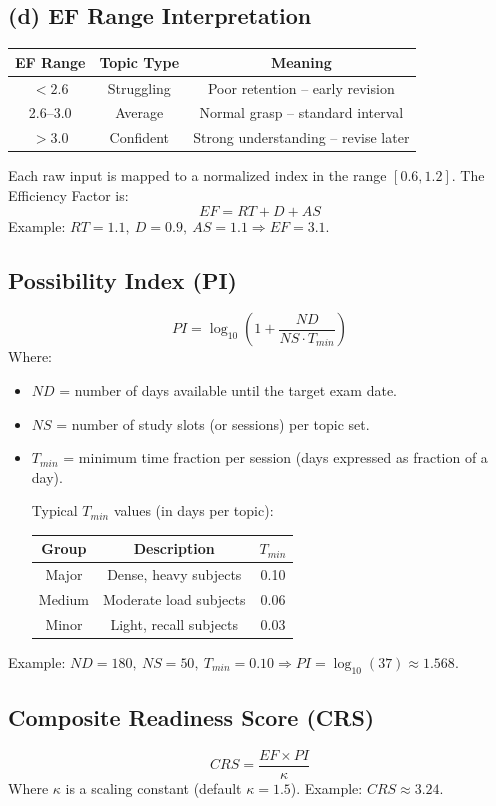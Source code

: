 \documentclass[11pt]{article}
\begin{document}
\subsection*{(d) EF Range Interpretation}
\begin{tabular}{ccc}
\toprule
EF Range & Topic Type & Meaning \\
\midrule
\(< 2.6\) & Struggling & Poor retention -- early revision \\
2.6--3.0 & Average & Normal grasp -- standard interval \\
\(> 3.0\) & Confident & Strong understanding -- revise later \\
\bottomrule
\end{tabular}
Each raw input is mapped to a normalized index in the range $[0.6,1.2]$. The Efficiency Factor is:
\[
EF = RT + D + AS
\]
Example: $RT=1.1,\ D=0.9,\ AS=1.1 \Rightarrow EF=3.1$.

\subsection{Possibility Index (PI)}
\[
PI = \log_{10}\left(1 + \frac{ND}{NS\cdot T_{min}}\right)
\]
Where:
\begin{itemize}
  \item $ND$ = number of days available until the target exam date.
  \item $NS$ = number of study slots (or sessions) per topic set.
  \item $T_{min}$ = minimum time fraction per session (days expressed as fraction of a day).
  
  Typical \( T_{min} \) values (in days per topic):
\begin{tabular}{ccc}
\toprule
Group & Description & \(T_{min}\) \\
\midrule
Major & Dense, heavy subjects & 0.10 \\
Medium & Moderate load subjects & 0.06 \\
Minor & Light, recall subjects & 0.03 \\
\bottomrule
\end{tabular}
\end{itemize}
Example: $ND=180,\ NS=50,\ T_{min}=0.10 \Rightarrow PI=\log_{10}(37)\approx1.568$.

\subsection{Composite Readiness Score (CRS)}
\[
CRS = \frac{EF\times PI}{\kappa}
\]
Where $\kappa$ is a scaling constant (default $\kappa=1.5$). Example: $CRS\approx3.24$.
\end{document}
